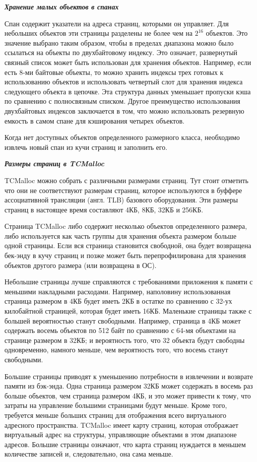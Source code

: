 \bigbreak
\textit{\textbf{Хранение малых объектов в спанах}}
	
Спан содержит указатели на адреса страниц, которыми он управляет. Для небольших объектов эти страницы разделены не более чем на $2^{16}$ объектов. Это значение выбрано таким образом, чтобы в пределах диапазона можно было ссылаться на объекты по двухбайтовому индексу. Это означает, развернутый связный список может быть использован для хранения объектов. Например, если есть 8-ми байтовые объекты, то можно хранить индексы трех готовых к использованию объектов и использовать четвертый слот для хранения индекса следующего объекта в цепочке. Эта структура данных уменьшает пропуски кэша по сравнению с полносвязным списком. Другое преимущество использования двухбайтовых индексов заключается в том, что можно использовать резервную емкость в самом спане для кэширования четырех объектов.

Когда нет доступных объектов определенного размерного класса, необходимо извлечь новый спан из кучи страниц и заполнить его.

\bigbreak
\textit{\textbf{Размеры страниц в TCMalloc}}

TCMalloc можно собрать с различными размерами страниц. Тут стоит отметить что они не соответствуют размерам страниц, которое используются в буффере ассоциативной трансляции (англ. TLB) базового оборудования. Эти размеры страниц в настоящее время составляют 4КБ, 8КБ, 32КБ и 256КБ.

Страница TCMalloc либо содержит несколько объектов определенного размера, либо используется как часть группы для хранения объекта размером больше одной страницы. Если вся страница становится свободной, она будет возвращена бек-энду в кучу страниц и позже может быть перепрофилирована для хранения объектов другого размера (или возвращена в ОС).

Небольшие страницы лучше справляются с требованиями приложения к памяти с меньшими накладными расходами. Например, наполовину использованная страница размером в 4КБ будет иметь 2КБ в остатке по сравнению с 32-ух килобайтной страницей, которая будет иметь 16КБ. Маленькие страницы также с большей вероятностью станут свободными. Например, страница в 4КБ может содержать восемь объектов по 512 байт по сравнению с 64-мя объектами на странице размером в 32КБ; и вероятность того, что 32 объекта будут свободны одновременно, намного меньше, чем вероятность того, что восемь станут свободными.

Большие страницы приводят к уменьшению потребности в извлечении и возврате памяти из бэк-энда. Одна страница размером 32КБ может содержать в восемь раз больше объектов, чем страница размером 4КБ, и это может привести к тому, что затраты на управление большими страницами будут меньше. Кроме того, требуется меньше больших страниц для отображения всего виртуального адресного пространства. TCMalloc имеет карту страниц, которая отображает виртуальный адрес на структуры, управляющие объектами в этом диапазоне адресов. Большие страницы означают, что карта страниц нуждается в меньшем количестве записей и, следовательно, она сама меньше.

